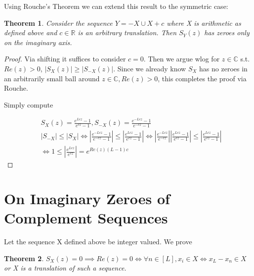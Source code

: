 \documentclass[10pt]{article}
\newcommand{\1}{\textbf{1}}
\newcommand{\R}{\mathbb{R}}
\newcommand{\C}{\mathbb{C}}
\newtheorem{theorem}{Theorem}
\theoremstyle{remark}
\theoremstyle{definition}
\begin{document}
Using Rouche's Theorem we can extend this result to the symmetric case:

\begin{theorem}
	Consider the sequence $Y = -X \cup X + c$ where X is arithmetic as defined above and $c \in \R$ is an arbitrary translation. Then $S_Y(z)$ has zeroes only on the imaginary axis.
\end{theorem}

\begin{proof}
	Via shifting it suffices to consider $c = 0$. Then we argue wlog for $z \in \C$ s.t. $Re(z) > 0$, $|S_X(z)| \geq |S_{-X}(z)|$. Since we already know $S_X$ has no zeroes in an arbitrarily small ball around $z \in \C, Re(z) > 0$, this completes the proof via Rouche. 

	Simply compute

	\begin{align*}
		& S_X(z) = \frac{e^{Lcz}-1}{e^{cz}-1}, S_{-X}(z) = \frac{e^{-Lcz}-1}{e^{-cz}-1} \\
		& |S_{-X}| \leq |S_{X}| \iff |\frac{e^{-Lcz}-1}{e^{-cz}-1}| \leq |\frac{e^{Lcz}-1}{e^{cz}-1}| \iff |\frac{e^{-Lcz}}{e^{-cz}}||\frac{e^{Lcz}-1}{e^{cz}-1}| \leq |\frac{e^{Lcz}-1}{e^{cz}-1}| \\
		& \iff 1 \leq |\frac{e^{Lcz}}{e^{cz}}| = e^{Re(z)(L-1)c}
	\end{align*}
\end{proof}

\section{On Imaginary Zeroes of Complement Sequences}

Let the sequence X defined above be integer valued. We prove 

\begin{theorem}
	$S_X(z) = 0 \implies Re(z) = 0 \iff \forall n \in [L], x_i \in X \iff x_L - x_n \in X$ or X is a translation of such a sequence.
\end{theorem}
\end{document}
